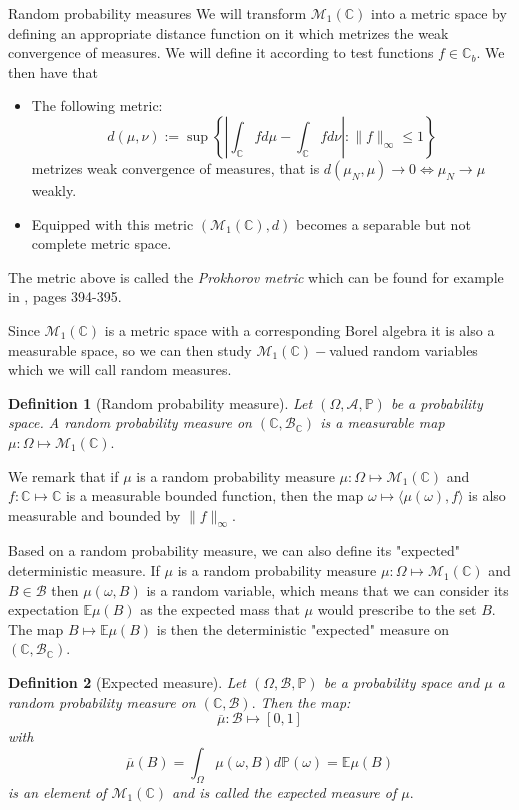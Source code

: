 \documentclass[11pt, a4paper, oneside]{book}
\numberwithin{equation}{chapter}
\newtheorem{definition}{Definition}[section]
\begin{document}
\begin{section}{Random probability measures}
We will transform $\mathcal{M}_1(\mathbb{C})$ into a metric space by defining an appropriate distance function on it which metrizes the weak convergence of measures. We will define it according to test functions $f\in \mathbb{C}_b$. We then have that
\begin{itemize}
    \item The following metric:
    \[
    d(\mu,\nu) := \sup \left \{ \left | \int_{\mathbb{C}} f d\mu  - \int_{\mathbb{C}} f d \nu \right |: \|f\|_\infty \leq 1 \right \}
    \]
    metrizes weak convergence of measures, that is $d(\mu_N,\mu) \to 0 \Leftrightarrow \mu_N \to \mu$ {weakly}. 
    \item Equipped with this metric $(\mathcal{M}_1(\mathbb{C}),d)$ becomes a separable but not complete metric space.
\end{itemize}
The metric above is called the \textit{Prokhorov metric} which can be found for example in \cite{dudley2002real}, pages 394-395. 

Since $\mathcal{M}_1(\mathbb{C})$ is a metric space with a corresponding Borel algebra it is also a measurable space, so we can then study $\mathcal{M}_1(\mathbb{C})-$valued random variables which we will call random measures.

\begin{definition}[Random probability measure]
Let $(\Omega, \mathcal{A}, \mathbb{P})$ be a probability space. A random probability measure on $(\mathbb{C},\mathcal{B}_{\mathbb{C}})$ is a measurable map $\mu : \Omega \mapsto \mathcal{M}_1({\mathbb{C}}).$
\end{definition}

We remark that if $\mu$ is a random probability measure $\mu: \Omega \mapsto \mathcal{M}_1(\mathbb{C})$ and $f:\mathbb{C} \mapsto \mathbb{C}$ is a measurable bounded function, then the map $\omega \mapsto \langle \mu(\omega), f \rangle$ is also measurable and bounded by $\|f\|_\infty.$

Based on a random probability measure, we can also define its  "expected" deterministic measure. If $\mu$ is a random probability measure $\mu : \Omega \mapsto \mathcal{M}_1(\mathbb{C})$ and $B \in \mathcal{B}$ then $\mu(\omega,B)$ is a random variable, which means that we can consider its expectation $\mathbb{E} \mu (B)$ as the expected mass that $\mu$ would prescribe to the set $B$. The map $B \mapsto \mathbb{E}\mu(B)$ is then the deterministic "expected" measure on $(\mathbb{C},\mathcal{B}_{\mathbb{C}}).$

\begin{definition}[Expected measure] \label{exp-m} Let $(\Omega,\mathcal{B},\mathbb{P})$ be a probability space and $\mu$ a random probability measure on $(\mathbb{C},\mathcal{B}).$ Then the map:
\[
\overline{\mu} : \mathcal{B} \mapsto [0,1]
\]
with 
\[
\overline{\mu}(B)= \int_\Omega \mu(\omega,B) d\mathbb{P}(\omega) = \mathbb{E}\mu(B)
\]
is an element of $\mathcal{M}_1(\mathbb{C})$ and is called the expected measure of $\mu.$
\end{definition}


\end{section}
\end{document}

